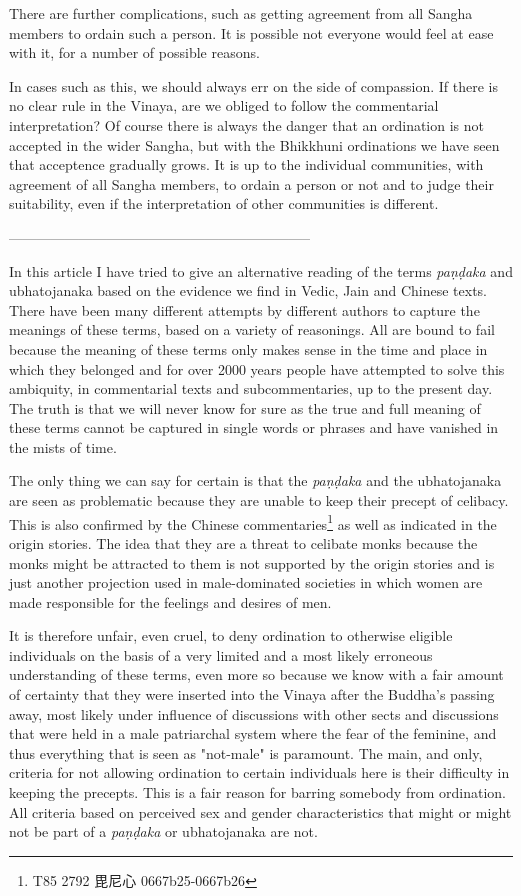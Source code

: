 There are further complications, such as getting agreement from all Sangha members to ordain such a person. It is possible not everyone would feel at ease with it, for a number of possible reasons.

In cases such as this, we should always err on the side of compassion. If there is no clear rule in the Vinaya, are we obliged to follow the commentarial interpretation? Of course there is always the danger that an ordination is not accepted in the wider Sangha, but with the Bhikkhuni ordinations we have seen that acceptence gradually grows. It is up to the individual communities, with agreement of all Sangha members, to ordain a person or not and to judge their suitability, even if the interpretation of other communities is different. 

-----------------------------------------------------------------



In this article I have tried to give an alternative reading of the terms {\em paṇḍaka} and ubhatojanaka based on the evidence we find in Vedic, Jain and Chinese texts. There have been many different attempts by different authors to capture the meanings of these terms, based on a variety of reasonings. All are bound to fail because the meaning of these terms only makes sense in the time and place in which they belonged and for over 2000 years people have attempted to solve this ambiquity, in commentarial texts and subcommentaries, up to the present day. The truth is that we will never know for sure as the true and full meaning of these terms cannot be captured in single words or phrases and have vanished in the mists of time. 

The only thing we can say for certain is that the {\em paṇḍaka} and the ubhatojanaka are seen as problematic because they are unable to keep their precept of celibacy. This is also confirmed by the Chinese commentaries\footnote{T85 2792 毘尼心 0667b25-0667b26} as well as indicated in the origin stories. The idea that they are a threat to celibate monks because the monks might be attracted to them is not supported by the origin stories and is just another projection used in male-dominated societies in which women are made responsible for the feelings and desires of men. 

It is therefore unfair, even cruel, to deny ordination to otherwise eligible individuals on the basis of a very limited and a most likely erroneous understanding of these terms, even more so because we know with a fair amount of certainty that they were inserted into the Vinaya after the Buddha's passing away, most likely under influence of discussions with other sects and discussions that were held in a male patriarchal system where the fear of the feminine, and thus everything that is seen as "not-male" is paramount. The main, and only, criteria for not allowing ordination to certain individuals here is their difficulty in keeping the precepts. This is a fair reason for barring somebody from ordination. All criteria based on perceived sex and gender characteristics that might or might not be part of a {\em paṇḍaka} or ubhatojanaka are not.